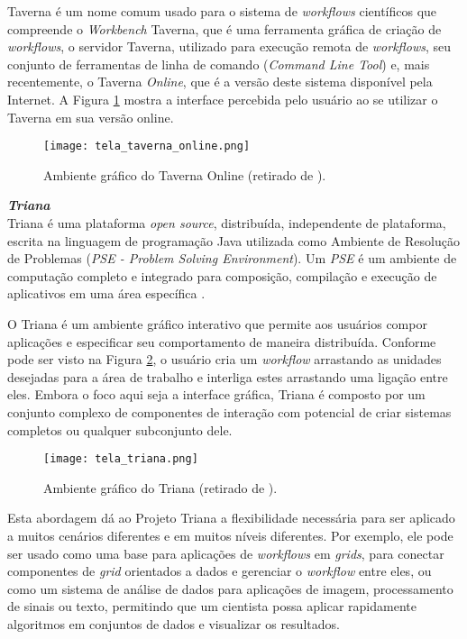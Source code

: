 Taverna é um nome comum usado para o sistema de \textit{workflows} científicos que compreende o \textit{Workbench} Taverna, que é uma ferramenta gráfica de criação de \textit{workflows}, o servidor Taverna, utilizado para execução remota de \textit{workflows}, seu conjunto de ferramentas de linha de comando (\textit{Command Line Tool}) e, mais recentemente, o Taverna \textit{Online}, que é a versão deste sistema disponível pela Internet. A Figura \ref{fig:tela_taverna} mostra a interface percebida pelo usuário ao se utilizar o Taverna em sua versão online. \\

\begin{figure}[ht]
	\centering
	\texttt{[image: tela\_taverna\_online.png]}
	\caption{Ambiente gráfico do Taverna Online (retirado de \cite{taverna_screen}).}
	\label{fig:tela_taverna}
\end{figure}
 
\noindent
\textbf{\textit{Triana}} \\

\noindent 
Triana \cite{triana_1} \cite{can_one_size_fit_all} é uma plataforma \textit{open source}, distribuída, independente de plataforma, escrita na linguagem de programação Java utilizada como Ambiente de Resolução de Problemas (\textit{PSE - Problem Solving Environment}). Um \textit{PSE} é um ambiente de computação completo e integrado para composição, compilação e execução de aplicativos em uma área específica \cite{problem_solving}. 

O Triana é um ambiente gráfico interativo que permite aos usuários compor aplicações e especificar seu comportamento de maneira distribuída. Conforme pode ser visto na Figura \ref{fig:tela_triana}, o usuário cria um \textit{workflow} arrastando as unidades desejadas para a área de trabalho e interliga estes arrastando uma ligação entre eles. Embora o foco aqui seja a interface gráfica, Triana é composto por um conjunto complexo de componentes de interação com potencial de criar sistemas completos ou qualquer subconjunto dele. 

\begin{figure}[ht]
	\centering
	\texttt{[image: tela\_triana.png]}
	\caption{Ambiente gráfico do Triana (retirado de \cite{triana_screen}).}
	\label{fig:tela_triana}
\end{figure}

Esta abordagem dá ao Projeto Triana a flexibilidade necessária para ser aplicado a muitos cenários diferentes e em muitos níveis diferentes. Por exemplo, ele pode ser usado como uma base para aplicações de \textit{workflows} em \textit{grids}, para conectar componentes de \textit{grid} orientados a dados e gerenciar o \textit{workflow} entre eles, ou como um sistema de análise de dados para aplicações de imagem, processamento de sinais ou texto, permitindo que um cientista possa aplicar rapidamente algoritmos em conjuntos de dados e visualizar os resultados. 

